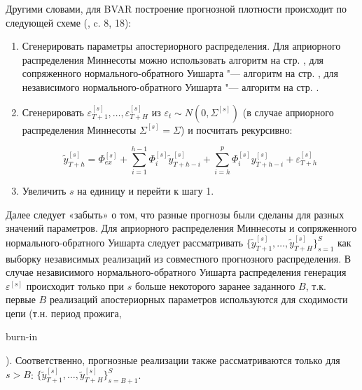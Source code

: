 \documentclass[11pt]{article} %
\newcommand{\eng}[1]{\begin{otherlanguage}{english}#1\end{otherlanguage}}
\begin{document}
Другими словами, для BVAR построение прогнозной плотности происходит по следующей схеме (\cite{karlsson_2012}, c. 8, 18):
\begin{enumerate}
\item Сгенерировать параметры апостериорного распределения. Для априорного распределения Миннесоты можно использовать алгоритм на стр. \pageref{alg:alg1}, для сопряженного нормального-обратного Уишарта  "---  алгоритм на стр. \pageref{alg:alg2}, для независимого нормального-обратного Уишарта "--- алгоритм на стр. \pageref{alg:alg3}.



\item Сгенерировать $\varepsilon^{[s]}_{T+1},\ldots,\varepsilon^{[s]}_{T+H}$ из $\varepsilon_t\sim N(0,\Sigma^{[s]})$ (в случае априорного распределения Миннесоты $\Sigma^{[s]}=\Sigma$) и посчитать рекурсивно:

\begin{equation}
\tilde y_{T+h}^{[s]}=\Phi_{ex}^{[s]}+\sum_{i=1}^{h-1} \Phi_{i}^{[s]} \tilde y_{T+h-i}^{[s]}+\sum_{i=h}^{p} \Phi_{i}^{[s]} y_{T+h-i}^{[s]} +\varepsilon_{T+h}^{[s]}
\end{equation}

\item Увеличить $s$ на единицу и перейти к шагу 1.
\end{enumerate}

Далее следует «забыть» о том, что разные прогнозы были сделаны для разных значений параметров.
Для априорного распределения Миннесоты и сопряженного нормального-обратного Уишарта  следует  рассматривать $\lbrace \tilde y_{T+1}^{[s]},\ldots,\tilde y_{T+H}^{[s]}\rbrace_{s=1}^{S}$ как выборку независимых реализаций из совместного прогнозного распределения. В случае  независимого нормального-обратного Уишарта распределения генерация $\varepsilon^{[s]}$ происходит только при $s$ больше некоторого заранее заданного $B$, т.к. первые $B$ реализаций апостериорных параметров используются для сходимости цепи (т.н. период прожига, \eng{burn-in}). Соответственно,  прогнозные реализации также рассматриваются только для $s>B$: $\lbrace \tilde y_{T+1}^{[s]},\ldots,\tilde y_{T+H}^{[s]}\rbrace_{s=B+1}^{S}$.
\end{document}
